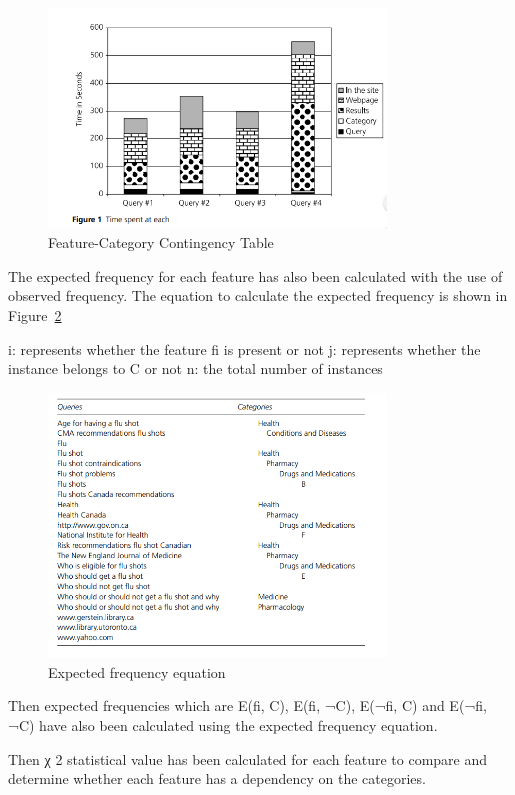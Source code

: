 \documentclass[]{article}
\begin{document}
\begin{figure}[b!]
	\includegraphics[width=0.8\textwidth]{Capture23.png}
	\caption{Feature-Category Contingency Table \label{fig23}}
\end{figure}   

The expected frequency for each feature has also been calculated with the use of observed frequency. The equation to calculate the expected frequency is shown in Figure~\ref{fig24}

i: represents whether the feature fi is present or not
j: represents whether the instance belongs to C or not
n: the total number of instances

\begin{figure}[t!]
	\includegraphics[width=0.8\textwidth]{Capture24.png}
	\caption{Expected frequency equation \label{fig24}}
\end{figure}   

Then expected frequencies which are E(fi, C), E(fi, ¬C), E(¬fi, C) and E(¬fi, ¬C) have also been calculated using the expected frequency equation.

Then χ 2 statistical value has been calculated for each feature to compare and determine whether each feature has a dependency on the categories.  
\end{document}
